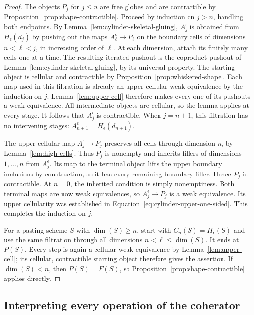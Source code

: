 \begin{proof}
The objects \(P_j\) for \(j\le n\) are free globes and are
contractible by Proposition~\ref{prop:shape-contractible}.  Proceed
by induction on \(j>n\), handling both endpoints.  By
Lemma~\ref{lem:cylinder-skeletal-gluing}, \(A_j^\epsilon\) is
obtained from \(H_\epsilon(d_j)\) by pushing out the maps
\(A_\ell^\epsilon\to P_\ell\) on the boundary cells of
dimensions \(n<\ell<j\), in increasing order of \(\ell\).
At each dimension, attach its finitely many cells one at a time.
The resulting iterated pushout is the coproduct pushout of
Lemma~\ref{lem:cylinder-skeletal-gluing}, by its universal property.
The starting object is cellular and contractible by
Proposition~\ref{prop:whiskered-shape}.  Each map used in this
filtration is already an upper cellular weak equivalence by the
induction on \(j\).  Lemma~\ref{lem:upper-cell} therefore makes
every one of its pushouts a weak equivalence.  All intermediate objects
are cellular, so the lemma applies at every stage.  It follows that
\(A_j^\epsilon\) is contractible.  When \(j=n+1\), this
filtration has no intervening stages:
\(A_{n+1}^\epsilon=H_\epsilon(d_{n+1})\).

The upper cellular map \(A_j^\epsilon\to P_j\) preserves all
cells through dimension \(n\), by Lemma~\ref{lem:high-cells}.
Thus \(P_j\) is nonempty and inherits fillers of dimensions
\(1,\ldots,n\) from \(A_j^\epsilon\).  Its map to the
terminal object lifts the upper boundary inclusions by construction,
so it has every remaining boundary filler.  Hence \(P_j\) is
contractible.  At \(n=0\), the inherited condition is simply
nonemptiness.  Both terminal maps are now weak equivalences, so
\(A_j^\epsilon\to P_j\) is a weak equivalence.  Its upper
cellularity was established in Equation~\eqref{eq:cylinder-upper-one-sided}.
This completes the induction on \(j\).

For a pasting scheme \(S\) with \(\dim(S)\ge n\), start with
\(C_n(S)=H_\epsilon(S)\) and use the same filtration through
all dimensions \(n<\ell\le\dim(S)\).  It ends at \(P(S)\).
Every step is again a cellular weak equivalence by
Lemma~\ref{lem:upper-cell}; its cellular, contractible starting object
therefore gives the assertion.  If \(\dim(S)<n\), then
\(P(S)=F(S)\), so Proposition~\ref{prop:shape-contractible}
applies directly.
\end{proof}

\subsection{Interpreting every operation of the coherator}


